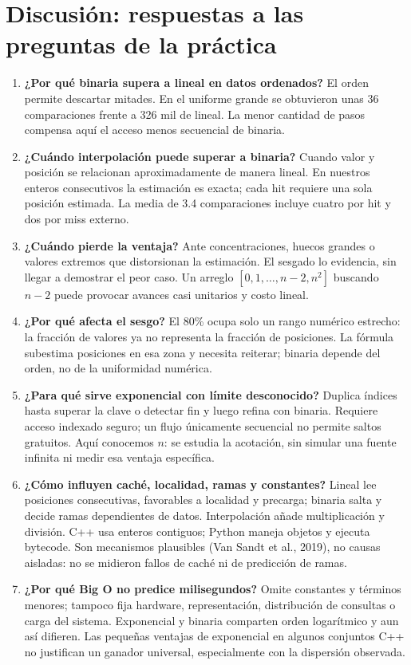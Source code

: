 \documentclass[10pt,a4paper]{article}
\begin{document}
\section{Discusión: respuestas a las preguntas de la práctica}
\begin{enumerate}[label=\textbf{\arabic*.},itemsep=3pt]
\item \textbf{¿Por qué binaria supera a lineal en datos ordenados?} El orden permite descartar mitades. En el uniforme grande se obtuvieron unas 36 comparaciones frente a 326 mil de lineal. La menor cantidad de pasos compensa aquí el acceso menos secuencial de binaria.
\item \textbf{¿Cuándo interpolación puede superar a binaria?} Cuando valor y posición se relacionan aproximadamente de manera lineal. En nuestros enteros consecutivos la estimación es exacta; cada hit requiere una sola posición estimada. La media de 3.4 comparaciones incluye cuatro por hit y dos por miss externo.
\item \textbf{¿Cuándo pierde la ventaja?} Ante concentraciones, huecos grandes o valores extremos que distorsionan la estimación. El sesgado lo evidencia, sin llegar a demostrar el peor caso. Un arreglo $[0,1,\ldots,n-2,n^2]$ buscando $n-2$ puede provocar avances casi unitarios y costo lineal.
\item \textbf{¿Por qué afecta el sesgo?} El 80\% ocupa solo un rango numérico estrecho: la fracción de valores ya no representa la fracción de posiciones. La fórmula subestima posiciones en esa zona y necesita reiterar; binaria depende del orden, no de la uniformidad numérica.
\item \textbf{¿Para qué sirve exponencial con límite desconocido?} Duplica índices hasta superar la clave o detectar fin y luego refina con binaria. Requiere acceso indexado seguro; un flujo únicamente secuencial no permite saltos gratuitos. Aquí conocemos $n$: se estudia la acotación, sin simular una fuente infinita ni medir esa ventaja específica.
\item \textbf{¿Cómo influyen caché, localidad, ramas y constantes?} Lineal lee posiciones consecutivas, favorables a localidad y precarga; binaria salta y decide ramas dependientes de datos. Interpolación añade multiplicación y división. C++ usa enteros contiguos; Python maneja objetos y ejecuta bytecode. Son mecanismos plausibles (Van Sandt et al., 2019), no causas aisladas: no se midieron fallos de caché ni de predicción de ramas.
\item \textbf{¿Por qué Big O no predice milisegundos?} Omite constantes y términos menores; tampoco fija hardware, representación, distribución de consultas o carga del sistema. Exponencial y binaria comparten orden logarítmico y aun así difieren. Las pequeñas ventajas de exponencial en algunos conjuntos C++ no justifican un ganador universal, especialmente con la dispersión observada.
\end{enumerate}
\end{document}
